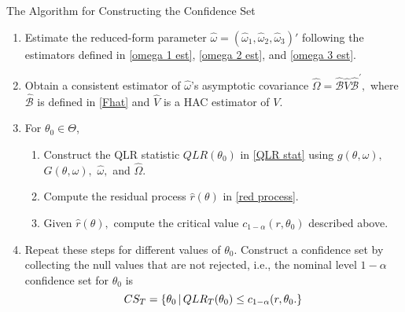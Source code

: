 \documentclass[smaller, aspectratio=169]{beamer}
\begin{document}
\begin{frame}[c]{The Algorithm for Constructing the Confidence Set}
  \begin{enumerate}
    \item Estimate the reduced-form parameter $\widehat{\omega} = \left(\widehat{\omega}_{1}, \widehat{\omega}_{2}, \widehat{\omega}_{3}\right)'$ following the estimators defined in \eqref{omega 1 est}, \eqref{omega 2 est}, and \eqref{omega 3 est}.
      \medskip
%
    \item Obtain a consistent estimator of $\widehat{\omega}$'s asymptotic covariance $\widehat{\Omega} = \widehat{\mathcal{B}}\widehat{V}\widehat{\mathcal{B}}^{\prime}, $ where $\widehat{\mathcal{B}}$ is defined in \eqref{Fhat} and $\widehat{V}$ is a HAC estimator of $V.$
      \medskip
  
    \item For $\theta_{0}\in \Theta$, 
%
    \begin{enumerate}
      \item Construct the QLR statistic $QLR(\theta_{0})$ in \eqref{QLR stat} using $g(\theta, \omega), $ $G(\theta, \omega), $ $\widehat{\omega}, $ and $\widehat{\Omega}.$
%
      \item Compute the residual process $\widehat{r}(\theta)$ in \eqref{red process}.
  
      \item Given $\widehat{r}(\theta), $ compute the critical value $c_{1-\alpha}(r, \theta_{0})$ described above.
%
    \end{enumerate}
      \medskip
%
    \item Repeat these steps for different values of $\theta_{0}$. Construct a confidence set by collecting the null values that are not rejected, i.e., the nominal level $1-\alpha $ confidence set for $\theta_{0}$ is
%
    \begin{equation}
      CS_{T} = \left\lbrace \theta_{0} \,\middle\vert\, QLR_{T}(\theta_{0})\leq c_{1-\alpha}(r, \theta_{0}. \right\rbrace
    \end{equation}
  \end{enumerate}
\end{frame}
\end{document}
